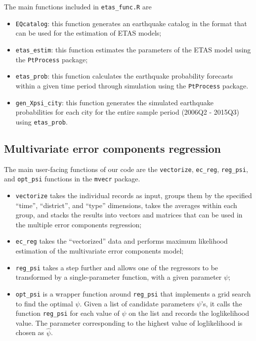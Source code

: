 \documentclass[
]{article}
\providecommand{\tightlist}{%
  \setlength{\itemsep}{0pt}\setlength{\parskip}{0pt}}
\begin{document}
The main functions included in \texttt{etas\_func.R} are

\begin{itemize}
\tightlist
\item
  \texttt{EQcatalog}: this function generates an earthquake catalog in
  the format that can be used for the estimation of ETAS models;
\item
  \texttt{etas\_estim}: this function estimates the parameters of the
  ETAS model using the \texttt{PtProcess} package;
\item
  \texttt{etas\_prob}: this function calculates the earthquake
  probability forecasts within a given time period through simulation
  using the \texttt{PtProcess} package.
\item
  \texttt{gen\_Xpsi\_city}: this function generates the simulated
  earthquake probabilities for each city for the entire sample period
  (2006Q2 - 2015Q3) using \texttt{etas\_prob}.
\end{itemize}

\hypertarget{multivariate-error-components-regression}{%
\subsection{Multivariate error components
regression}\label{multivariate-error-components-regression}}

The main user-facing functions of our code are the \texttt{vectorize},
\texttt{ec\_reg}, \texttt{reg\_psi}, and \texttt{opt\_psi} functions in
the \texttt{mvecr} package.

\begin{itemize}
\tightlist
\item
  \texttt{vectorize} takes the individual records as input, groups them
  by the specified ``time'', ``district'', and ``type'' dimensions,
  takes the averages within each group, and stacks the results into
  vectors and matrices that can be used in the multiple error components
  regression;
\item
  \texttt{ec\_reg} takes the ``vectorized'' data and performs maximum
  likelihood estimation of the multivariate error components model;
\item
  \texttt{reg\_psi} takes a step further and allows one of the
  regressors to be transformed by a single-parameter function, with a
  given parameter \(\psi\);
\item
  \texttt{opt\_psi} is a wrapper function around \texttt{reg\_psi} that
  implements a grid search to find the optimal \(\psi\). Given a list of
  candidate parameters \(\psi\)'s, it calls the function
  \texttt{reg\_psi} for each value of \(\psi\) on the list and records
  the loglikelihood value. The parameter corresponding to the highest
  value of loglikelihood is chosen as \(\hat{\psi}\).
\end{itemize}
\end{document}

